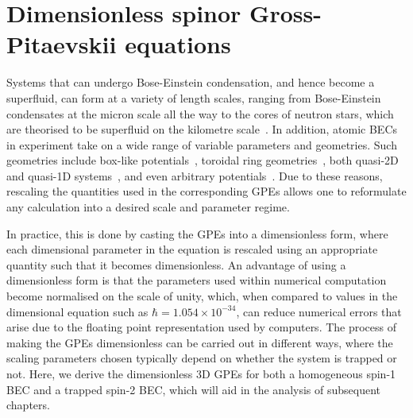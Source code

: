 \section{\label{sec: dimensionless-equations}
Dimensionless spinor Gross-Pitaevskii equations}
Systems that can undergo Bose-Einstein condensation, and hence become a
superfluid, can form at a variety of length scales, ranging from Bose-Einstein
condensates at the micron scale all the way to the cores of neutron stars,
which are theorised to be superfluid on the kilometre
scale~\cite{Warszawski2011}.
In addition, atomic BECs in experiment take on a wide range of variable
parameters and geometries.
Such geometries include box-like potentials~\cite{Gaunt2013}, toroidal ring
geometries~\cite{Ryu2007, Ramanathan2011}, both quasi-2D~\cite{Neely2010}
and quasi-1D systems~\cite{Burger1999}, and even arbitrary
potentials~\cite{Henderson2009}.
Due to these reasons, rescaling the quantities used in the corresponding GPEs
allows one to reformulate any calculation into a desired scale and parameter
regime.

In practice, this is done by casting the GPEs into a dimensionless form, where
each dimensional parameter in the equation is rescaled using an appropriate
quantity such that it becomes dimensionless.
An advantage of using a dimensionless form is that the parameters used within
numerical computation become normalised on the scale of unity, which,
when compared to values in the dimensional equation such as \(\hbar =
1.054\times 10^{-34}\), can reduce numerical errors that arise due to the
floating point representation used by computers.
The process of making the GPEs dimensionless can be carried out in different
ways, where the scaling parameters chosen typically depend on whether the system
is trapped or not.
Here, we derive the dimensionless 3D GPEs for both a homogeneous spin-1 BEC and
a trapped spin-2 BEC, which will aid in the analysis of subsequent chapters.

